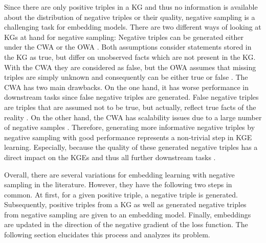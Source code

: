 Since there are only positive triples in a \ac{KG} and thus no information is available about the distribution of negative triples or their quality, negative sampling is a challenging task for embedding models.
There are two different ways of looking at \acp{KG} at hand for negative sampling:
Negative triples can be generated either under the \ac{CWA} or the \ac{OWA} \cite{qiannegative}.
Both assumptions consider statements stored in the \ac{KG} as true, but differ on unobserved facts which are not present in the \ac{KG}.
With the \ac{CWA} they are considered as false, but the \ac{OWA} assumes that missing triples are simply unknown and consequently can be either true or false
\cite{qiannegative}.
The \ac{CWA} has two main drawbacks.
On the one hand, it has worse performance in downstream tasks \cite{qiannegative} since false negative triples are generated.
False negative triples are triples that are assumed not to be true, but actually, reflect true facts of the reality \cite{qianunderstanding}.
On the other hand, the \ac{CWA} has scalability issues due to a large number of negative samples \cite{qiannegative}.
Therefore, generating more informative negative triples by negative sampling with good performance represents a non-trivial step in \ac{KGE} learning.
Especially, because the quality of these generated negative triples has a direct impact on the \acp{KGE} and thus all further downstream tasks \cite{qiannegative}.

Overall, there are several variations for embedding learning with negative sampling in the literature.
However, they have the following two steps in common.
At first, for a given positive triple, a negative triple is generated.
Subsequently, positive triples from a \ac{KG} as well as generated negative triples from negative sampling are given to an embedding model.
Finally, embeddings are updated in the direction of the negative gradient of the loss function.
The following section elucidates this process and analyzes its problem.